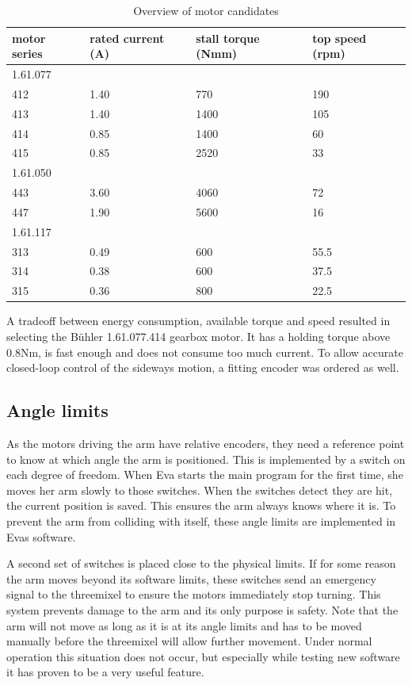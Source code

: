 \documentclass[technical_document.tex]{subfiles}
\begin{document}
\begin{table}[h]
\begin{tabular}{| p{3cm} | p{3cm} | p{3cm} | p{3cm} |}
\hline
motor series	&	rated current (A)	&	stall torque (Nmm)	&	top speed (rpm)	\\
\hline
1.61.077		&						&						&					\\
412				&	1.40				&	770					&	190				\\
413				&	1.40				&	1400				&	105				\\
414				&	0.85				&	1400				&	60				\\
415				&	0.85				&	2520				&	33				\\
\hline
1.61.050		&						&						&					\\
443				&	3.60				&	4060				&	72				\\
447				&	1.90				&	5600				&	16				\\
\hline
1.61.117		&						&						&					\\
313				&	0.49				&	600					&	55.5			\\
314				&	0.38				&	600					&	37.5			\\
315				&	0.36				&	800					&	22.5			\\

\hline
\end{tabular}
\caption{Overview of motor candidates}
\label{table:motors}
\end{table}


A tradeoff between energy consumption, available torque and speed resulted in selecting the B\"{u}hler 1.61.077.414 gearbox motor. It has a holding torque above 0.8Nm, is fast enough and does not consume too much current. To allow accurate closed-loop control of the sideways motion, a fitting encoder was ordered as well.


\subsection{Angle limits}

As the motors driving the arm have relative encoders, they need a reference point to know at which angle the arm is positioned. This is implemented by a switch on each degree of freedom. When Eva starts the main program for the first time, she moves her arm slowly to those switches. When the switches detect they are hit, the current position is saved. This ensures the arm always knows where it is. To prevent the arm from colliding with itself, these angle limits are implemented in Eva\textquotesingle{}s software.

A second set of switches is placed close to the physical limits. If for some reason the arm moves beyond its software limits, these switches send an emergency signal to the threemixel to ensure the motors immediately stop turning. This system prevents damage to the arm and its only purpose is safety. Note that the arm will not move as long as it is at its angle limits and has to be moved manually before the threemixel will allow further movement. Under normal operation this situation does not occur, but especially while testing new software it has proven to be a very useful feature.
\end{document}
